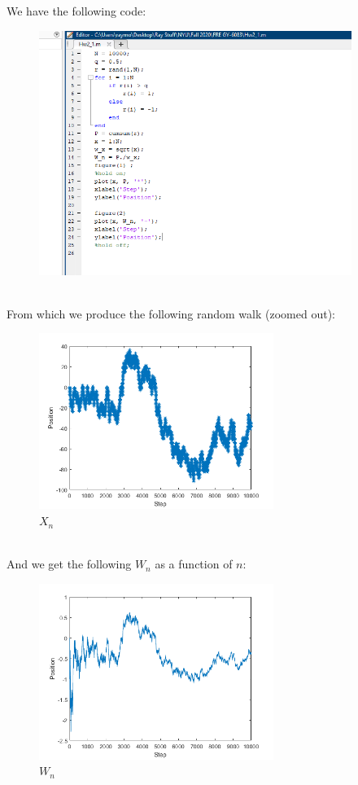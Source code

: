 \documentclass[12pt,twoside, letter]{exam}
\theoremstyle{definition}
\begin{document}
  We have the following code:
  \\
  \begin{figure}[h]
    \centering
        \includegraphics[width=4in]{Hw2_1c}
  \end{figure}
  \\
  From which we produce the following random walk (zoomed out):
  \\
  \begin{figure}[h]
    \caption{$X_{n}$}
    \centering
      \includegraphics[width=3in]{Hw2_1a}
  \end{figure}
  \\
  And we get the following $W_{n}$ as a function of $n$:
  \\
  \begin{figure}[h]
    \caption{$W_{n}$}
    \centering
      \includegraphics[width=3in]{Hw2_1b}
  \end{figure}
\end{document}
